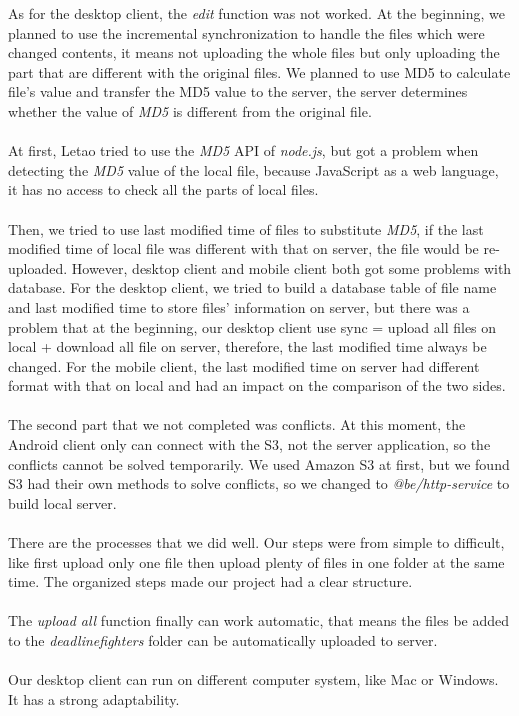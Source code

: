 \documentclass[a4paper]{article}
\begin{document}
{As for the desktop client, the \emph{edit} function was not worked. At the beginning, we planned to use the incremental synchronization to handle the files which were changed contents, it means not uploading the whole files but only uploading the part that are different with the original files. We planned to use MD5 to calculate file’s value and transfer the MD5 value to the server, the server determines whether the value of \emph{MD5} is different from the original file.\\\\
At first, Letao tried to use the \emph{MD5} API of \emph{node.js}, but got a problem when detecting the \emph{MD5} value of the local file, because JavaScript as a web language, it has no access to check all the parts of local files.\\\\
Then, we tried to use last modified time of files to substitute \emph{MD5}, if the last modified time of local file was different with that on server, the file would be re-uploaded. However, desktop client and mobile client both got some problems with database. For the desktop client, we tried to build a database table of file name and last modified time to store files’ information on server, but there was a problem that at the beginning, our desktop client use sync = upload all files on local + download all file on server, therefore, the last modified time always be changed. For the mobile client, the last modified time on server had different format with that on local and had an impact on the comparison of the two sides.\\\\
The second part that we not completed was conflicts. At this moment, the Android client only can connect with the S3, not the server application, so the conflicts cannot be solved temporarily. We used Amazon S3 at first, but we found S3 had their own methods to solve conflicts, so we changed to \emph{@be/http-service} to build local server.\\\\
There are the processes that we did well. Our steps were from simple to difficult, like first upload only one file then upload plenty of files in one folder at the same time. The organized steps made our project had a clear structure. \\\\
The \emph{upload all} function finally can work automatic, that means the files be added to the \emph{deadlinefighters} folder can be automatically uploaded to server.\\\\
Our desktop client can run on different computer system, like Mac or Windows. It has a strong adaptability.\\\\



}
\end{document}
